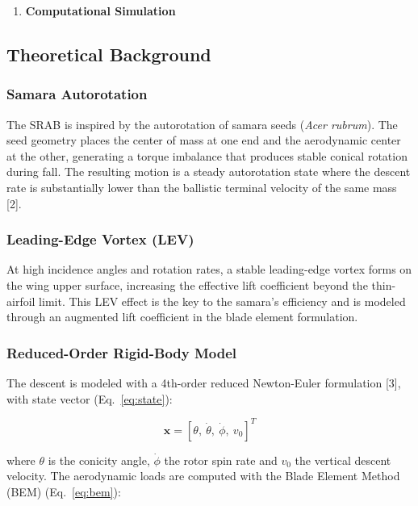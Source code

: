 \begin{enumerate}
\def\labelenumi{\arabic{enumi}.}
\setcounter{enumi}{3}
\item
  \textbf{Computational Simulation}
\end{enumerate}

\subsection{Theoretical Background}

\subsubsection{Samara Autorotation}

The SRAB is inspired by the autorotation of samara seeds (\emph{Acer
rubrum}). The seed geometry places the center of mass at one end and
the aerodynamic center at the other, generating a torque imbalance
that produces stable conical rotation during fall. The resulting
motion is a steady autorotation state where the descent rate is
substantially lower than the ballistic terminal velocity of the same
mass [2].

\subsubsection{Leading-Edge Vortex (LEV)}

At high incidence angles and rotation rates, a stable leading-edge
vortex forms on the wing upper surface, increasing the effective lift
coefficient beyond the thin-airfoil limit. This LEV effect is the key
to the samara's efficiency and is modeled through an augmented lift
coefficient in the blade element formulation.

\subsubsection{Reduced-Order Rigid-Body Model}

The descent is modeled with a 4th-order reduced Newton-Euler
formulation [3], with state vector (Eq.~\ref{eq:state}):

\begin{equation}
\mathbf{x} = [\theta,\ \dot{\theta},\ \dot{\phi},\ v_0]^T
\label{eq:state}
\end{equation}

where $\theta$ is the conicity angle, $\dot{\phi}$ the rotor spin rate
and $v_0$ the vertical descent velocity. The aerodynamic loads are
computed with the Blade Element Method (BEM) (Eq.~\ref{eq:bem}):

